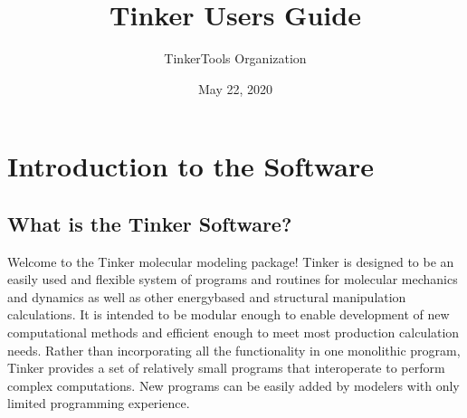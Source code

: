 \documentclass[letterpaper,11pt,english]{sphinxmanual}
\title{Tinker User\textquotesingle{}s Guide}
\date{May 22, 2020}
\author{TinkerTools Organization}
\begin{document}
\pagestyle{empty}
\sphinxmaketitle
\pagestyle{plain}
\sphinxtableofcontents
\pagestyle{normal}
\label{\detokenize{index::doc}}



\chapter{Introduction to the Software}
\label{\detokenize{text/introduction:introduction-to-the-software}}\label{\detokenize{text/introduction::doc}}

\section{What is the Tinker Software?}
\label{\detokenize{text/introduction:what-is-the-tinker-software}}
Welcome to the Tinker molecular modeling package! Tinker is designed to be an easily used and flexible system of programs and routines for molecular mechanics and dynamics as well as other energy\sphinxhyphen{}based and structural manipulation calculations. It is intended to be modular enough to enable development of new computational methods and efficient enough to meet most production calculation needs. Rather than incorporating all the functionality in one monolithic program, Tinker provides a set of relatively small programs that interoperate to perform complex computations. New programs can be easily added by modelers with only limited programming experience.
\end{document}

